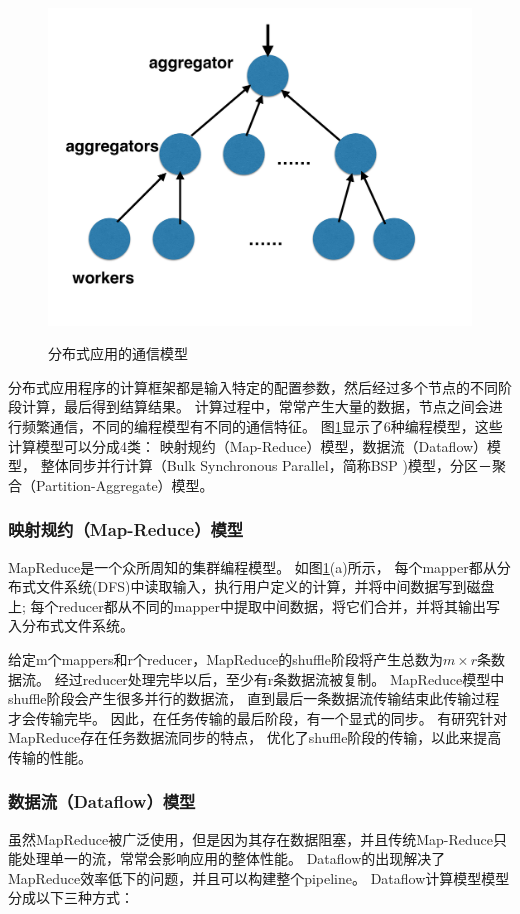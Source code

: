 \begin{figure}[h]
      {\includegraphics[width=0.48\columnwidth]{figures/others/partition-aggregate.pdf}}
  \caption{分布式应用的通信模型}
  \label{relatedwork-communication-fig}
\end{figure}

分布式应用程序的计算框架都是输入特定的配置参数，然后经过多个节点的不同阶段计算，最后得到结算结果。
计算过程中，常常产生大量的数据，节点之间会进行频繁通信，不同的编程模型有不同的通信特征。
图\ref{relatedwork-communication-fig}显示了6种编程模型，这些计算模型可以分成4类：
映射规约（Map-Reduce）模型，数据流（Dataflow）模型，
整体同步并行计算（Bulk Synchronous Parallel，简称BSP )模型，分区－聚合（Partition-Aggregate）模型。

\subsubsection{映射规约（Map-Reduce）模型}
MapReduce\cite{Dean2004Simplified}是一个众所周知的集群编程模型。
如图\ref{relatedwork-communication-fig}(a)所示，
每个mapper都从分布式文件系统(DFS)中读取输入，执行用户定义的计算，并将中间数据写到磁盘上;
每个reducer都从不同的mapper中提取中间数据，将它们合并，并将其输出写入分布式文件系统。

给定m个mappers和r个reducer，MapReduce的shuffle阶段将产生总数为$m\times r$条数据流。
经过reducer处理完毕以后，至少有r条数据流被复制。
MapReduce模型中shuffle阶段会产生很多并行的数据流，
直到最后一条数据流传输结束此传输过程才会传输完毕。
因此，在任务传输的最后阶段，有一个显式的同步。
有研究\cite{Chowdhury2011Managing}针对MapReduce存在任务数据流同步的特点，
优化了shuffle阶段的传输，以此来提高传输的性能。

\subsubsection{数据流（Dataflow）模型}
虽然MapReduce被广泛使用，但是因为其存在数据阻塞，并且传统Map-Reduce只能处理单一的流，常常会影响应用的整体性能。
Dataflow的出现解决了MapReduce效率低下的问题，并且可以构建整个pipeline。
Dataflow计算模型模型分成以下三种方式：

